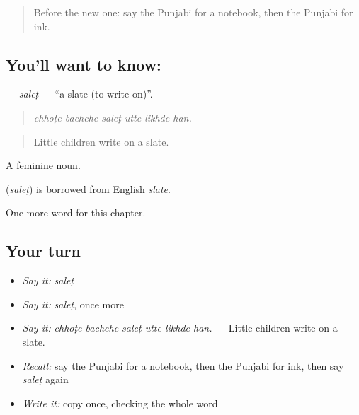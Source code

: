 \label{lesson:PA-C357-salet}



\begin{quote}
Before the new one: say the Punjabi for a notebook, then the Punjabi for ink.
\end{quote}

\subsection*{You'll want to know: }
\textbf{} — \emph{saleṭ} — \textquotedblleft{}a slate (to write on)\textquotedblright{}.

\begin{quote}
     
\end{quote}

\begin{quote}
\emph{chhoṭe bachche saleṭ utte likhde han.}
\end{quote}

\begin{quote}
Little children write on a slate.
\end{quote}

A feminine noun.

\begin{cousinweb}
\textbf{} (\emph{saleṭ}) is borrowed from English \emph{slate}.
\end{cousinweb}

\begin{grammarlens}[title={What you've built}]
One more word for this chapter.
\end{grammarlens}

\subsection*{Your turn}
\begin{itemize}
\raggedright
  \item \emph{Say it:} \emph{saleṭ}
  \item \emph{Say it:} \emph{saleṭ}, once more
  \item \emph{Say it:} \emph{chhoṭe bachche saleṭ utte likhde han.} — Little children write on a slate.
  \item \emph{Recall:} say the Punjabi for a notebook, then the Punjabi for ink, then say \emph{saleṭ} again
  \item \emph{Write it:} copy \textbf{} once, checking the whole word
\end{itemize}

